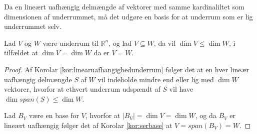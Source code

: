 Da en lineært uafhængig delmængde af vektorer med samme kardinaliltet som dimensionen af underrummet, må det udgøre en basis for at underrum som er lig underrummet selv.
\begin{stn}
Lad $V$ og $W$ være underrum til $\mathds{R}^n$, og lad $V \subseteq W$, da vil $\dim{V} \leq \dim{W}$, i tilfældet at $\dim{V}=\dim{W}$ da er $V=W$.
\end{stn}
\begin{proof}
Af Korolar \ref{kor:linearuafhangighedunderrum} følger det at en hver lineær uafhængig delmængde $S$ af $W$ vil indeholde mindre end eller lig med $\dim{W}$ vektorer, hvorfor at ethvert underrum udspændt af $S$ vil have $\dim{span(S)} \leq \dim{W}$.

Lad $B_V$ være en base for $V$, hvorfor at $|B_V| = \dim{V} = \dim{W}$, og da $B_V$ er lineært uafhængig følger det af Korolar \ref{kor:serbase} at $V = span(B_V) = W$.
\end{proof}